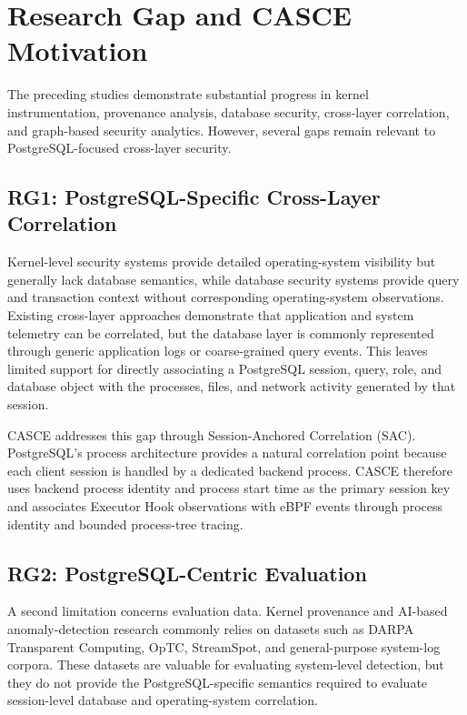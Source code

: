 \documentclass[conference]{IEEEtran}
\begin{document}
\section{Research Gap and CASCE Motivation}

The preceding studies demonstrate substantial progress in kernel instrumentation, provenance analysis, database security, cross-layer correlation, and graph-based security analytics. However, several gaps remain relevant to PostgreSQL-focused cross-layer security.

\subsection{RG1: PostgreSQL-Specific Cross-Layer Correlation}

Kernel-level security systems provide detailed operating-system visibility but generally lack database semantics, while database security systems provide query and transaction context without corresponding operating-system observations. Existing cross-layer approaches demonstrate that application and system telemetry can be correlated, but the database layer is commonly represented through generic application logs or coarse-grained query events. This leaves limited support for directly associating a PostgreSQL session, query, role, and database object with the processes, files, and network activity generated by that session.

CASCE addresses this gap through Session-Anchored Correlation (SAC). PostgreSQL's process architecture provides a natural correlation point because each client session is handled by a dedicated backend process. CASCE therefore uses backend process identity and process start time as the primary session key and associates Executor Hook observations with eBPF events through process identity and bounded process-tree tracing.

\subsection{RG2: PostgreSQL-Centric Evaluation}

A second limitation concerns evaluation data. Kernel provenance and AI-based anomaly-detection research commonly relies on datasets such as DARPA Transparent Computing, OpTC, StreamSpot, and general-purpose system-log corpora. These datasets are valuable for evaluating system-level detection, but they do not provide the PostgreSQL-specific semantics required to evaluate session-level database and operating-system correlation.
\end{document}
